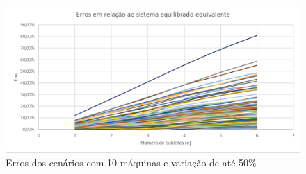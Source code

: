 \begin{figure}[!ht]
    \centering
    \includegraphics[width=12cm]{Resultados/Figuras/e10_50}
    \caption{Erros dos cenários com 10 máquinas e variação de até 50\%}
    \label{fig:e10_50}
\end{figure}